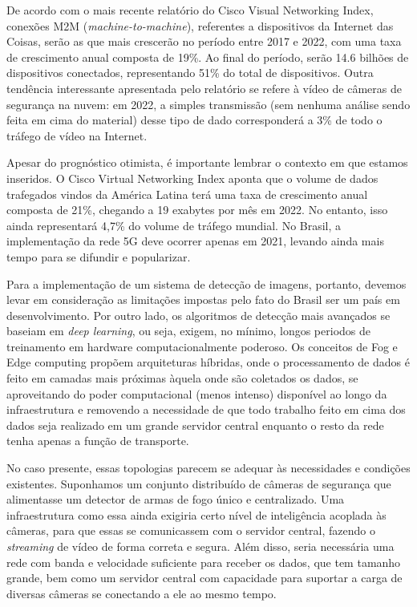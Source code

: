\documentclass[]{politex}
\begin{document}
De acordo com o mais recente relatório do Cisco Visual Networking Index\cite{cisco}, conexões M2M (\textit{machine-to-machine}), referentes a dispositivos da Internet das Coisas, serão as que mais crescerão no período entre 2017 e 2022, com uma taxa de crescimento anual composta de 19\%. Ao final do período, serão 14.6 bilhões de dispositivos conectados, representando 51\% do total de dispositivos. Outra tendência interessante apresentada pelo relatório se refere à vídeo de câmeras de segurança na nuvem: em 2022, a simples transmissão (sem nenhuma análise sendo feita em cima do material) desse tipo de dado corresponderá a 3\% de todo o tráfego de vídeo na Internet.

Apesar do prognóstico otimista, é importante lembrar o contexto em que estamos inseridos. O Cisco Virtual Networking Index aponta que o volume de dados trafegados vindos da América Latina terá uma taxa de crescimento anual composta de 21\%, chegando a 19 exabytes por mês em 2022. No entanto, isso ainda representará 4,7\% do volume de tráfego mundial. No Brasil, a implementação da rede 5G deve ocorrer apenas em 2021, levando ainda mais tempo para se difundir e popularizar.

Para a implementação de um sistema de detecção de imagens, portanto, devemos levar em consideração as limitações impostas pelo fato do Brasil ser um país em desenvolvimento. Por outro lado, os algoritmos de detecção mais avançados se baseiam em \textit{deep learning}, ou seja, exigem, no mínimo, longos periodos de treinamento em hardware computacionalmente poderoso. Os conceitos de Fog e Edge computing propõem arquiteturas híbridas, onde o processamento de dados é feito em camadas mais próximas àquela onde são coletados os dados, se aproveitando do poder computacional (menos intenso) disponível ao longo da infraestrutura e removendo a necessidade de que todo trabalho feito em cima dos dados seja realizado em um grande servidor central enquanto o resto da rede tenha apenas a função de transporte.

No caso presente, essas topologias parecem se adequar às necessidades e condições existentes. Suponhamos um conjunto distribuído de câmeras de segurança que alimentasse um detector de armas de fogo único e centralizado. Uma infraestrutura como essa ainda exigiria certo nível de inteligência acoplada às câmeras, para que essas se comunicassem com o servidor central, fazendo o \textit{streaming} de vídeo de forma correta e segura. Além disso, seria necessária uma rede com banda e velocidade suficiente para receber os dados, que tem tamanho grande, bem como um servidor central com capacidade para suportar a carga de diversas câmeras se conectando a ele ao mesmo tempo.
\end{document}
